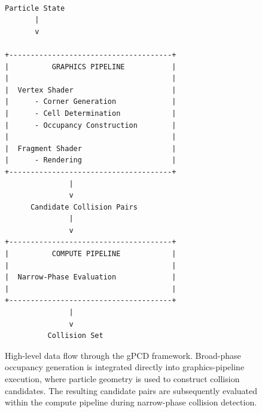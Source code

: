 \begin{figure}[h!]
\centering
\begin{verbatim}

Particle State
       |
       v

+--------------------------------------+
|          GRAPHICS PIPELINE           |
|                                      |
|  Vertex Shader                       |
|      - Corner Generation             |
|      - Cell Determination            |
|      - Occupancy Construction        |
|                                      |
|  Fragment Shader                     |
|      - Rendering                     |
+--------------------------------------+
               |
               v
      Candidate Collision Pairs
               |
               v
+--------------------------------------+
|          COMPUTE PIPELINE            |
|                                      |
|  Narrow-Phase Evaluation             |
|                                      |
+--------------------------------------+
               |
               v
          Collision Set
\end{verbatim}
\caption{High-level data flow through the gPCD framework. Broad-phase occupancy
generation is integrated directly into graphics-pipeline execution,
where particle geometry is used to construct collision candidates. The
resulting candidate pairs are subsequently evaluated within the compute
pipeline during narrow-phase collision detection.}
\label{fig:gpcd_dataflow}
\end{figure}